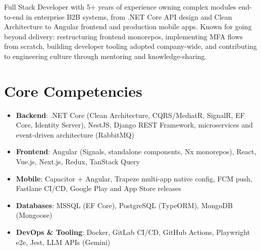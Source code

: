 \documentclass[11pt,a4paper,sans]{moderncv}
\begin{document}
\makecvtitle


\vspace{6pt}
\small{Full Stack Developer with 5+ years of experience owning complex modules end-to-end in enterprise B2B systems, from .NET Core API design and Clean Architecture to Angular frontend and production mobile apps. Known for going beyond delivery: restructuring frontend monorepos, implementing MFA flows from scratch, building developer tooling adopted company-wide, and contributing to engineering culture through mentoring and knowledge-sharing.}


\section{Core Competencies}
\vspace{1pt}
\begin{itemize}

\item \textbf{Backend}: .NET Core (Clean Architecture, CQRS/MediatR, SignalR, EF Core, Identity Server), NestJS, Django REST Framework, microservices and event-driven architecture (RabbitMQ)

\item \textbf{Frontend}: Angular (Signals, standalone components, Nx monorepos), React, Vue.js, Next.js, Redux, TanStack Query

\item \textbf{Mobile}: Capacitor + Angular, Trapeze multi-app native config, FCM push, Fastlane CI/CD, Google Play and App Store releases

\item \textbf{Databases}: MSSQL (EF Core), PostgreSQL (TypeORM), MongoDB (Mongoose)

\item \textbf{DevOps \& Tooling}: Docker, GitLab CI/CD, GitHub Actions, Playwright e2e, Jest, LLM APIs (Gemini)

\end{itemize}

\end{document}
